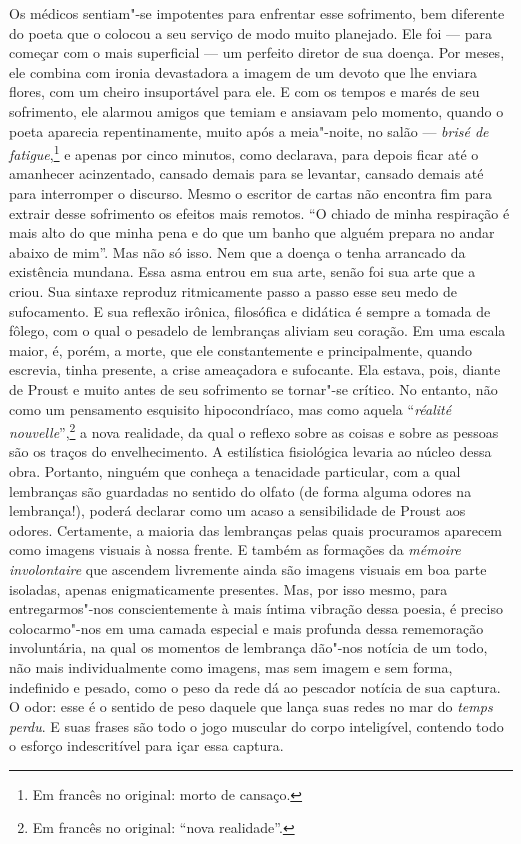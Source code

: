 Os médicos sentiam"-se impotentes para enfrentar esse sofrimento, bem
diferente do poeta que o colocou a seu serviço de modo muito planejado.
Ele foi --- para começar com o mais superficial --- um perfeito diretor de
sua doença. Por meses, ele combina com ironia devastadora a imagem de um
devoto que lhe enviara flores, com um cheiro insuportável para ele. E
com os tempos e marés de seu sofrimento, ele alarmou amigos que temiam e
ansiavam pelo momento, quando o poeta aparecia repentinamente, muito
após a meia"-noite, no salão --- \emph{brisé de fatigue},\footnote{Em francês no original:
  morto de cansaço. \versal{[N.~T.]}} e apenas por cinco minutos, como declarava, para
depois ficar até o amanhecer acinzentado, cansado demais para se
levantar, cansado demais até para interromper o discurso. Mesmo o
escritor de cartas não encontra fim para extrair desse sofrimento os
efeitos mais remotos. ``O chiado de minha respiração é mais alto do que
minha pena e do que um banho que alguém prepara no andar abaixo de
mim''. Mas não só isso. Nem que a doença o tenha arrancado da existência
mundana. Essa asma entrou em sua arte, senão foi sua arte que a criou.
Sua sintaxe reproduz ritmicamente passo a passo esse seu medo de
sufocamento. E sua reflexão irônica, filosófica e didática é sempre a
tomada de fôlego, com o qual o pesadelo de lembranças aliviam seu
coração. Em uma escala maior, é, porém, a morte, que ele constantemente
e principalmente, quando escrevia, tinha presente, a crise ameaçadora e
sufocante. Ela estava, pois, diante de Proust e muito antes de seu
sofrimento se tornar"-se crítico. No entanto, não como um pensamento
esquisito hipocondríaco, mas como aquela ``\emph{réalité nouvelle}'',\footnote{Em francês no original: ``nova realidade''. \versal{[N.~T.]}} a nova realidade,
da qual o reflexo sobre as coisas e sobre as pessoas são os traços do
envelhecimento. A estilística fisiológica levaria ao núcleo dessa obra.
Portanto, ninguém que conheça a tenacidade particular, com a qual
lembranças são guardadas no sentido do olfato (de forma alguma odores na
lembrança!), poderá declarar como um acaso a sensibilidade de Proust aos
odores. Certamente, a maioria das lembranças pelas quais procuramos
aparecem como imagens visuais à nossa frente. E também as formações da
\emph{mémoire} \emph{involontaire} que ascendem livremente ainda são
imagens visuais em boa parte isoladas, apenas enigmaticamente presentes.
Mas, por isso mesmo, para entregarmos"-nos conscientemente à mais íntima
vibração dessa poesia, é preciso colocarmo"-nos em uma camada especial e
mais profunda dessa rememoração involuntária, na qual os momentos de
lembrança dão"-nos notícia de um todo, não mais individualmente como
imagens, mas sem imagem e sem forma, indefinido e pesado, como o peso da
rede dá ao pescador notícia de sua captura. O odor: esse é o sentido de
peso daquele que lança suas redes no mar do \emph{temps perdu}. E suas
frases são todo o jogo muscular do corpo inteligível, contendo todo o
esforço indescritível para içar essa captura.

